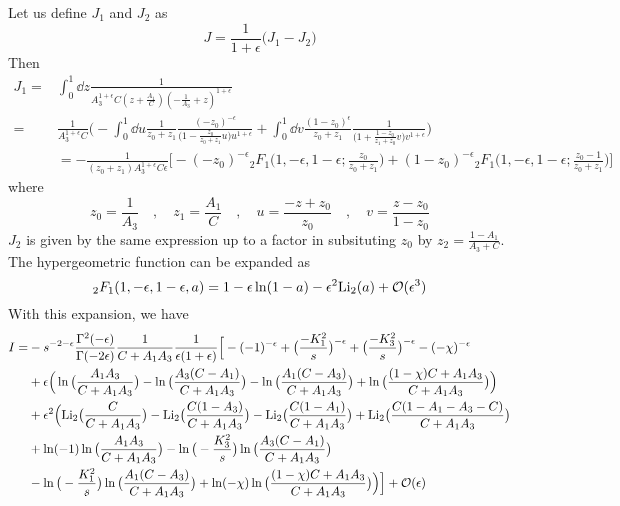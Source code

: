 Let us define $J_1$ and $J_2$ as
\begin{equation}
J = \frac{1}{1+\epsilon}\big(J_1-J_2\big)
\end{equation}
Then
\begin{equation}
\begin{split}
J_1 = & \int^1_0 \dd z \frac{1}{A_3^{1+\epsilon}C(z + \frac{A_1}{C})(-\frac{1}{A_3} + z)^{1+\epsilon}} 
\\
= &
\frac{1}{A_3^{1+\epsilon}C}\Big(
-\int^1_0 \dd u \frac{1}{z_0 + z_1}\frac{(-z_0)^{-\epsilon}}{\big(1-\frac{z_0}{z_0 + z_1}u\big) u^{1+\epsilon}} +
\int^1_0\dd v \frac{(1-z_0)^{\epsilon}}{z_0 + z_1}\frac{1}{\big(1+ \frac{1-z_0}{z_1 + z_0}v\big)v^{1+\epsilon}}\Big)
\\
& = 
-\frac{1}{(z_0 + z_1 )A_3^{1+\epsilon}C\epsilon}
\Big[-(-z_0)^{-\epsilon}{}_2F_1\big(1,-\epsilon, 1-\epsilon; \frac{z_0}{z_0 + z_1}\big)
+ (1-z_0)^{-\epsilon}{}_2F_1\big(1, -\epsilon, 1-\epsilon; \frac{z_0 -1}{z_0 + z_1}\big)\Big]
\end{split}
\end{equation}
where
\begin{equation}
z_0 = \frac{1}{A_3} \quad, \quad z_1 = \frac{A_1}{C}
\quad,\quad
u=\frac{-z + z_0}{z_0}\quad,\quad
v=\frac{z-z_0}{1-z_0}
\end{equation}
$J_2$ is given by the same expression up to a factor in subsituting $z_0$ by $z_2 = \frac{1 - A_1}{A_3 + C}$. 
The hypergeometric function can be expanded as
\begin{equation}
{}_2F_1 (1,-\epsilon, 1-\epsilon, a) = 
1-\epsilon\ln(1-a) - \epsilon^2 \mathrm{Li}_2 (a) + \mathcal{O}(\epsilon^3)
\end{equation}
\iffalse
With this expansion, we have
\begin{equation}
\begin{split}
I  = &
-s^{-2-\epsilon}\frac{\Gamma^2(-\epsilon)}{\Gamma(-2\epsilon)}
\frac{1}{C+A_1A_3}\frac{1}{\epsilon(1+\epsilon)}\Big[
-(-1)^{-\epsilon} + \big(\frac{-K_1^2}{s}\big)^{-\epsilon} + \big(\frac{-K_3^2}{s}\big)^{-\epsilon} - (-\chi)^{-\epsilon}
\\
&+
\epsilon\Big(\ln\big(\frac{A_1A_3}{C+A_1A_3}\big) - \ln\big(\frac{A_3(C-A_1 )}{C+A_1A_3}\big) - \ln\big(\frac{A_1(C-A_3)}{C+A_1A_3}\big) +
\ln\big(\frac{(1-\chi)C + A_1A_3}{C+A_1A_3}\big) 
\Big)
\\
& +\epsilon^2\Big(
\mathrm{Li}_2\big(\frac{C}{C+A_1A_3}\big) - \mathrm{Li}_2\big(\frac{C(1-A_3)}{C+A_1A_3}\big) - \mathrm{Li}_2\big(\frac{C(1-A_1)}{C+A_1A_3}\big)+\mathrm{Li}_2\big(\frac{C(1-A_1-A_3-C)}{C+A_1A_3}\big)
\\
& +\ln(-1)\ln\big(\frac{A_1A_3}{C+A_1A_3}\big)
-\ln\big(-\frac{K_3^2}{s}\big)\ln\big(\frac{A_3(C-A_1)}{C+A_1A_3}\big)
\\
&
-\ln\big(-\frac{K_1^2}{s}\big)\ln\big(\frac{A_1(C-A_3)}{C+A_1A_3}\big)
+\ln(-\chi)\ln\big(\frac{(1-\chi)C + A_1A_3}{C+A_1A_3}\big)
\Big)
\Big]
+\mathcal{O}(\epsilon)
\end{split}
\end{equation}
